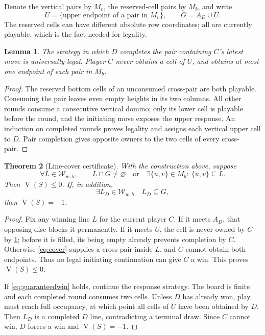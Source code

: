 \documentclass[11pt]{article}
\newtheorem{theorem}{Theorem}[section]
\newtheorem{lemma}[theorem]{Lemma}
\theoremstyle{definition}
\theoremstyle{remark}
\newcommand{\W}{\mathcal W}
\newcommand{\Val}{\operatorname{V}}
\begin{document}
Denote the vertical pairs by $M_v$, the reserved-cell pairs by $M_b$, and
write
\[
 U=\{\text{upper endpoint of a pair in }M_v\},\qquad G=A_D\cup U.
\]
The reserved cells can have different absolute row coordinates; all are
currently playable, which is the fact needed for legality.

\begin{lemma}\label{lem:midlegal}
The strategy in which $D$ completes the pair containing $C$'s latest move
is universally legal. Player $C$ never obtains a cell of $U$, and obtains
at most one endpoint of each pair in $M_b$.
\end{lemma}
\begin{proof}
The reserved bottom cells of an unconsumed cross-pair are both playable.
Consuming the pair leaves even empty heights in its two columns. All other
rounds consume a consecutive vertical domino; only its lower cell is
playable before the round, and the initiating move exposes the upper
response. An induction on completed rounds proves legality and assigns
each vertical upper cell to $D$. Pair completion gives opposite owners to
the two cells of every cross-pair.
\end{proof}

\begin{theorem}[Line-cover certificate]\label{thm:cover}
With the construction above, suppose
\begin{equation}\label{eq:cover}
 \forall L\in\W_{w,h},\qquad
 L\cap G\ne\varnothing
 \quad\text{or}\quad
 \exists\{u,v\}\in M_b:\ \{u,v\}\subseteq L.
\end{equation}
Then $\Val(S)\le0$. If, in addition,
\begin{equation}\label{eq:guaranteedwin}
 \exists L_D\in\W_{w,h}\quad L_D\subseteq G,
\end{equation}
then $\Val(S)=-1$.
\end{theorem}
\begin{proof}
Fix any winning line $L$ for the current player $C$. If it meets $A_D$,
that opposing disc blocks it permanently. If it meets $U$, the cell is
never owned by $C$ by \cref{lem:midlegal}; before it is filled, its being
empty already prevents completion by $C$. Otherwise
\eqref{eq:cover} supplies a cross-pair inside $L$, and $C$ cannot obtain
both endpoints. Thus no legal initiating continuation can give $C$ a win.
This proves $\Val(S)\le0$.

If \eqref{eq:guaranteedwin} holds, continue the response strategy. The
board is finite and each completed round consumes two cells. Unless $D$
has already won, play must reach full occupancy, at which point all cells
of $U$ have been obtained by $D$. Then $L_D$ is a completed $D$ line,
contradicting a terminal draw. Since $C$ cannot win, $D$ forces a win and
$\Val(S)=-1$.
\end{proof}
\end{document}

